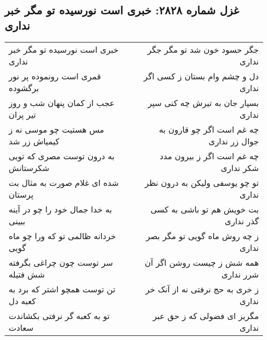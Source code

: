 \begin{center}
\section*{غزل شماره ۲۸۲۸: خبری است نورسیده تو مگر خبر نداری}
\label{sec:2828}
\begin{longtable}{l p{0.5cm} r}
خبری است نورسیده تو مگر خبر نداری
&&
جگر حسود خون شد تو مگر جگر نداری
\\
قمری است رونموده پر نور برگشوده
&&
دل و چشم وام بستان ز کسی اگر نداری
\\
عجب از کمان پنهان شب و روز تیر پران
&&
بسپار جان به تیرش چه کنی سپر نداری
\\
مس هستیت چو موسی نه ز کیمیاش زر شد
&&
چه غم است اگر چو قارون به جوال زر نداری
\\
به درون توست مصری که تویی شکرستانش
&&
چه غم است اگر ز بیرون مدد شکر نداری
\\
شده ای غلام صورت به مثال بت پرستان
&&
تو چو یوسفی ولیکن به درون نظر نداری
\\
به خدا جمال خود را چو در آینه ببینی
&&
بت خویش هم تو باشی به کسی گذر نداری
\\
خردانه ظالمی تو که ورا چو ماه گویی
&&
ز چه روش ماه گویی تو مگر بصر نداری
\\
سر توست چون چراغی بگرفته شش فتیله
&&
همه شش ز چیست روشن اگر آن شرر نداری
\\
تن توست همچو اشتر که برد به کعبه دل
&&
ز خری به حج نرفتی نه از آنک خر نداری
\\
تو به کعبه گر نرفتی بکشاندت سعادت
&&
مگریز ای فضولی که ز حق عبر نداری
\\
\end{longtable}
\end{center}
